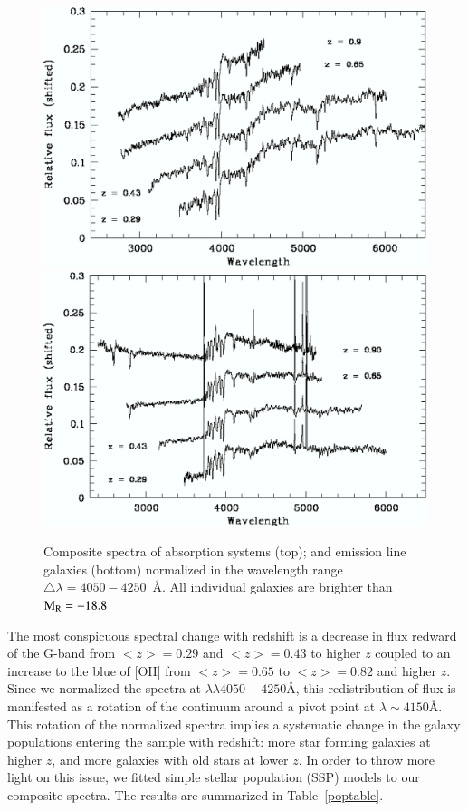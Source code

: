 \documentclass[referee]{aa}
\begin{document}
\begin{figure}
  \vspace{-0.0cm} 
 \centering
      \includegraphics[width=12cm]{figures/egmnFig7b.eps}
      \includegraphics[width=12cm]{figures/egmnFig7c.eps}
  \vspace{-0.0cm}
    \caption{Composite spectra of absorption systems (top); and emission line galaxies (bottom) normalized
		in the wavelength range $\triangle \lambda = 4050 - 4250$~\AA. All individual galaxies are brighter than 
$\rm M_R = -18.8$}
    \label{All}
\end{figure}


The most conspicuous spectral change with redshift is a decrease in flux redward of the G-band from $<z>=0.29$ 
and $<z>=0.43$ to higher $z$ coupled to an increase to the blue of [OII] from  $<z>=0.65$ to  $<z>=0.82$ and higher $z$. Since we 
normalized  the spectra at $\lambda\lambda 4050-4250$\AA, this redistribution of flux
is manifested as a rotation of the continuum around a pivot point at $\lambda\sim 4150$\AA. This rotation of the normalized spectra implies
a systematic change in the galaxy populations entering the sample with redshift: more star forming galaxies at higher $z$,
and more galaxies with old stars at  lower $z$. In order to throw more light 
on this issue, we fitted simple stellar population (SSP) models  to our composite spectra. The  results are summarized in Table~\ref{poptable}.
\rm
\end{document}
